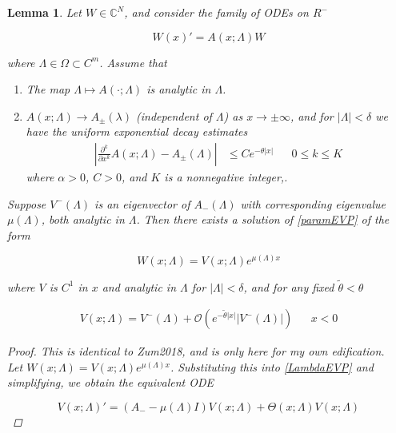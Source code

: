 \documentclass[12pt]{article}
\def\C{{\mathbb C}}
\newtheorem{lemma}{Lemma}
\begin{document}
\begin{lemma}\label{gaplemma}
Let $W \in \C^N$, and consider the family of ODEs on $R^-$

\begin{equation}\label{LambdaEVP}
W(x)' = A(x; \Lambda) W
\end{equation}

where $\Lambda \in \Omega \subset C^m$. Assume that

\begin{enumerate}
	\item The map $\Lambda \mapsto A(\cdot; \Lambda)$ is analytic in $\Lambda$.
	\item $A(x; \Lambda) \rightarrow A_\pm(\lambda)$ (independent of $\Lambda$) as $x \rightarrow \pm \infty$, and for $|\Lambda| < \delta$ we have the uniform exponential decay estimates 
	\begin{align}
	\left| \frac{\partial^k}{\partial x^k} A(x; \Lambda) - A_\pm(\Lambda) \right| 
	&\leq C e^{-\theta |x|} && 0 \leq k \leq K
	\end{align}
	where $\alpha > 0$, $C > 0$, and $K$ is a nonnegative integer,.
\end{enumerate}

Suppose $V^-(\Lambda)$ is an eigenvector of $A_-(\Lambda)$ with corresponding eigenvalue $\mu(\Lambda)$, both analytic in $\Lambda$. Then there exists a solution of \ref{paramEVP} of the form 

\begin{equation}
W(x; \Lambda) = V(x; \Lambda) e^{\mu(\Lambda)x}
\end{equation}

where $V$ is $C^1$ in $x$ and analytic in $\Lambda$ for $|\Lambda| < \delta$, and for any fixed $\tilde{\theta} < \theta$

\begin{align}
V(x; \Lambda) = V^-(\Lambda) + \mathcal{O}(e^{-\tilde{\theta}|x|}|V^-(\Lambda)|) && x < 0
\end{align}

\begin{proof}
This is identical to Zum2018, and is only here for my own edification.\\

Let $W(x; \Lambda) = V(x; \Lambda) e^{\mu(\Lambda) x}$. Substituting this into \eqref{LambdaEVP} and simplifying, we obtain the equivalent ODE

\begin{equation}\label{VEVP}
V(x; \Lambda)' = (A_- - \mu(\Lambda)I)V(x; \Lambda) + \Theta(x; \Lambda) V(x; \Lambda)
\end{equation}


\end{proof}
\end{lemma}
\end{document}
